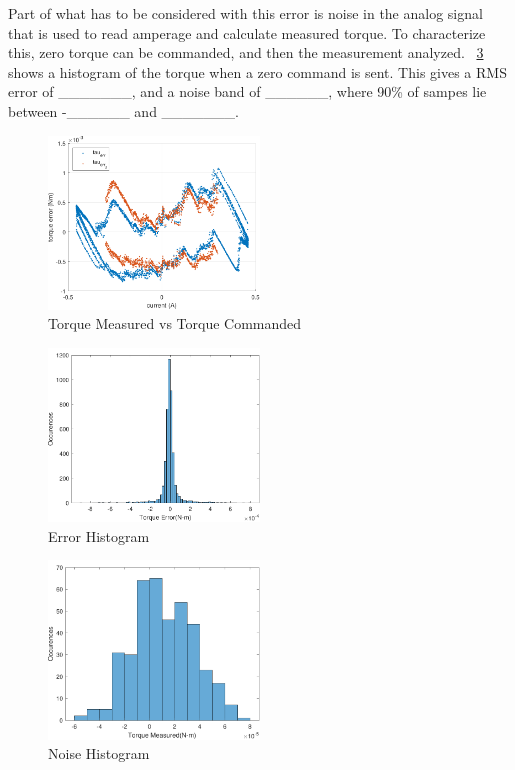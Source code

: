 \documentclass[11pt, letterpaper]{article}
\begin{document}
\begin{itemize}
Part of what has to be considered with this error is noise in the analog signal that is used to read amperage and calculate measured torque.
To characterize this, zero torque can be commanded, and then the measurement analyzed.  
\figurename~\ref{fig:NoiseHistogram} shows a histogram of the torque when a zero command is sent.
This gives a RMS error of _______, and a noise band of ______, where 90\% of sampes lie between -______ and _______.

\begin{figure}[tb]
  \centering
  \includegraphics[width=0.5\textwidth]{diagrams/TorqueCommanded.pdf}
  \caption{Torque Measured vs Torque Commanded}
  \label{fig:TorqueCommanded}
\end{figure}

\begin{figure}[tb]
  \centering
  \includegraphics[width=0.5\textwidth]{diagrams/ErrorHistogram.pdf}
  \caption{Error Histogram}
  \label{fig:ErrorHistogram}
\end{figure}

\begin{figure}[tb]
  \centering
  \includegraphics[width=0.5\textwidth]{diagrams/NoiseHistogram.pdf}
  \caption{Noise Histogram}
  \label{fig:NoiseHistogram}
\end{figure}

\end{itemize}
\end{document}
